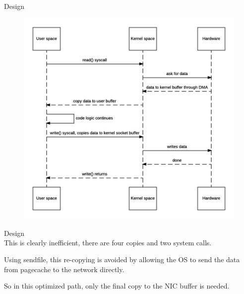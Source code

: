 \begin{frame}[plain,t]{Design} %
     \\
    \vspace{2ex}
    \begin{figure}
        \centering
        \includegraphics[width=0.7\linewidth]{image/0201}
        \label{fig:0201}
    \end{figure}
    
    
    
\end{frame}
\begin{frame}[plain,t]{Design} %
     \\
    \vspace{2ex}
    This is clearly inefficient, there are four copies and two system calls. 
    
    \vspace{2ex}
    Using sendfile, this re-copying is avoided by allowing the OS to send the data from pagecache to the network directly. 
    
    \vspace{2ex}
    So in this optimized path, only the final copy to the NIC buffer is needed.
    
\end{frame}
